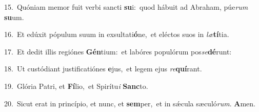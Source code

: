 {\numbfont\textcolor{\numbcolor}{15.}}~Quóniam memor fuit verbi sancti \textbf{su}\-i:~\star quod hábuit ad Abraham, púe\textit{rum} \textbf{su}\-um.\par
{\numbfont\textcolor{\numbcolor}{16.}}~Et edúxit pópulum suum in exsultati\-\textbf{ó}\-ne,~\star et eléctos suos in \textit{læ}\-\textbf{tí}tia.\par
{\numbfont\textcolor{\numbcolor}{17.}}~Et dedit illis regiónes \textbf{Gén}\-tium:~\star et labóres populórum pos\-\textit{se}\-\textbf{dé}runt:\par
{\numbfont\textcolor{\numbcolor}{18.}}~Ut custódiant justificatiónes \textbf{e}\-jus,~\star et legem ejus \textit{re}\-\textbf{quí}rant.\par
{\numbfont\textcolor{\numbcolor}{19.}}~Glória Patri, et \textbf{Fí}\-lio,~\star et Spirítu\textit{i} \textbf{Sanc}\-to.\par
{\numbfont\textcolor{\numbcolor}{20.}}~Sicut erat in princípio, et nunc, et \textbf{sem}\-per,~\star et in sǽcula sæculó\-\textit{rum}\-. \textbf{A}\-men.\par
